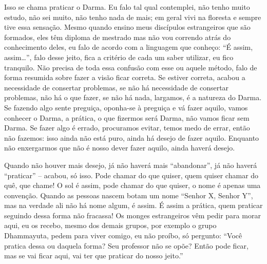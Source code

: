 Isso se chama praticar o Darma. Eu falo tal qual contemplei, não
tenho muito estudo, não sei muito, não tenho nada de mais; em geral
vivi na floresta e sempre tive essa sensação. Mesmo quando ensino meus
discípulos estrangeiros que são formados, eles têm diploma de mestrado
mas não vou correndo atrás do conhecimento deles, eu falo de acordo com
a linguagem que conheço: “É assim, assim…”, falo desse jeito, fica a
critério de cada um saber utilizar, eu fico tranquilo. Não precisa de
toda essa confusão com esse ou aquele método, falo de forma resumida
sobre fazer a visão ficar correta. Se estiver correta, acabou a
necessidade de consertar problemas, se não há necessidade de consertar
problemas, não há o que fazer, se não há nada, largamos, é a natureza
do Darma. Se fazendo algo sente preguiça, oponha-se à preguiça e vá
fazer aquilo, vamos conhecer o Darma, a prática, o que fizermos será
Darma, não vamos ficar sem Darma. Se fazer algo é errado, procuramos
evitar, temos medo de errar, então não fazemos: isso ainda não está
puro, ainda há desejo de fazer aquilo. Enquanto não enxergarmos que não
é nosso dever fazer aquilo, ainda haverá desejo. 

Quando não houver mais desejo, já não haverá mais “abandonar”, já
não haverá “praticar” – acabou, só isso. Pode chamar do que quiser,
quem quiser chamar do quê, que chame! O sol é assim, pode chamar do que
quiser, o nome é apenas uma convenção. Quando as pessoas nascem botam
um nome “Senhor X, Senhor Y”, mas na verdade ali não há nome algum, é
assim. É assim a prática, quem praticar seguindo dessa forma não
fracassa! Os monges estrangeiros vêm pedir para morar aqui, eu os
recebo, mesmo dos demais grupos, por exemplo o grupo Dhammayuta, pedem
para viver comigo, eu não proíbo, só pergunto: “Você pratica dessa ou
daquela forma? Seu professor não se opõe? Então pode ficar, mas se vai
ficar aqui, vai ter que praticar do nosso jeito.”
